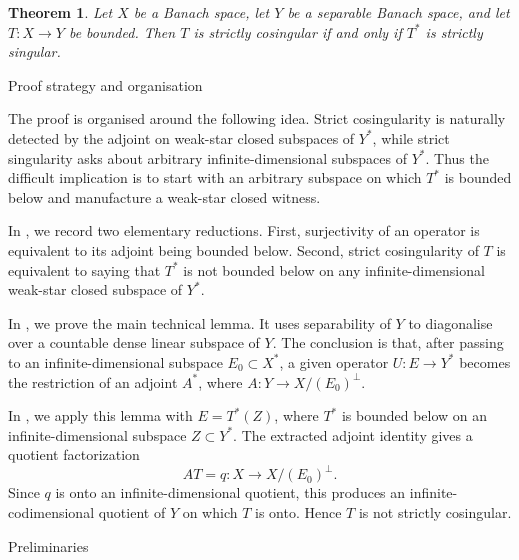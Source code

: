 \documentclass[11pt,reqno]{amsart}
\makeatletter
\theoremstyle{plain}
\newtheorem{theorem}{Theorem}[section]
\theoremstyle{definition}
\newcounter{problempaper}
\newenvironment{problempaperbody}{%
  \setcounter{subsection}{0}%
  \setcounter{subsubsection}{0}%
  \setcounter{paragraph}{0}%
  \renewcommand{\thesubsection}{\arabic{subsection}}%
  \renewcommand{\thesubsubsection}{\thesubsection.\arabic{subsubsection}}%
  \renewcommand{\theparagraph}{\thesubsubsection.\arabic{paragraph}}%
  \let\problem@outersection\section
  \let\problem@outersubsection\subsection
  \let\problem@outersubsubsection\subsubsection
  \let\problem@outerparagraph\paragraph
  \let\section\problem@papersection
  \let\subsection\problem@papersubsection
  \let\subsubsection\problem@papersubsubsection
}{%
  \let\section\problem@outersection
  \let\subsection\problem@outersubsection
  \let\subsubsection\problem@outersubsubsection
  \let\paragraph\problem@outerparagraph
}
\newcommand{\problem@target}[2]{%
  \hypertarget{problem-\theproblempaper-#1-#2}{}%
}
\newcommand{\problem@paperheading}[3]{%
  \par\bigskip
  \problem@target{#1}{#2}%
  \noindent{\large\bfseries #2.\quad #3\par}%
  \nobreak\smallskip
}
\newcommand{\problem@papersubheading}[3]{%
  \par\medskip
  \problem@target{#1}{#2}%
  \noindent{\normalsize\bfseries #2.\quad #3\par}%
  \nobreak\smallskip
}
\newcommand{\problem@papersubsubheading}[3]{%
  \par\smallskip
  \problem@target{#1}{#2}%
  \noindent{\normalsize\itshape #2.\quad #3.\ }%
}
\def\problem@papersection{%
  \@ifstar{\problem@papersectionstar}{\problem@papersectionnostar}%
}
\def\problem@papersectionstar#1{%
  \par\bigskip\noindent{\large\bfseries #1\par}\nobreak\smallskip
}
\def\problem@papersectionnostar#1{%
  \refstepcounter{subsection}%
  \setcounter{subsubsection}{0}%
  \setcounter{paragraph}{0}%
  \problem@paperheading{section}{\thesubsection}{#1}%
  \problem@writecontentsline{section}{\thesubsection}{#1}%
}
\def\problem@papersubsection{%
  \@ifstar{\problem@papersubsectionstar}{\problem@papersubsectionnostar}%
}
\def\problem@papersubsectionstar#1{%
  \par\medskip\noindent{\normalsize\bfseries #1\par}\nobreak\smallskip
}
\def\problem@papersubsectionnostar#1{%
  \refstepcounter{subsubsection}%
  \setcounter{paragraph}{0}%
  \problem@papersubheading{subsection}{\thesubsubsection}{#1}%
  \problem@writecontentsline{subsection}{\thesubsubsection}{#1}%
}
\def\problem@papersubsubsection{%
  \@ifstar{\problem@papersubsubsectionstar}{\problem@papersubsubsectionnostar}%
}
\def\problem@papersubsubsectionstar#1{%
  \par\smallskip\noindent{\normalsize\itshape #1.\ }%
}
\def\problem@papersubsubsectionnostar#1{%
  \refstepcounter{paragraph}%
  \problem@papersubsubheading{subsubsection}{\theparagraph}{#1}%
  \problem@writecontentsline{subsubsection}{\theparagraph}{#1}%
}
\newcommand{\problem@writecontentsline}[3]{%
  \begingroup
  \protected@write\@auxout{}{%
    \string\problemcontentsentry{\theproblempaper}{#1}{#2}{#3}{\thepage}%
  }%
  \endgroup
}
\newcommand{\problemcontentsentry}[5]{%
  \@ifundefined{problemcontents@#1}{%
    \expandafter\gdef\csname problemcontents@#1\endcsname{}%
  }{}%
  \expandafter\g@addto@macro\csname problemcontents@#1\endcsname{%
    \problemcontentsline{#1}{#2}{#3}{#4}{#5}%
  }%
}
\newcommand{\problemcontentslink}[4]{%
  \hyperlink{problem-#1-#2-#3}{#4}%
}
\newcommand{\problemcontentsline}[5]{%
  \ifstrequal{#2}{section}{%
    \par\noindent
    \problemcontentslink{#1}{#2}{#3}{\makebox[2.5em][l]{#3}#4}%
    \nobreak\dotfill
    \problemcontentslink{#1}{#2}{#3}{#5}\par
  }{%
    \ifstrequal{#2}{subsection}{%
      \par\noindent\hspace*{1.5em}%
      \problemcontentslink{#1}{#2}{#3}{\makebox[3.5em][l]{#3}#4}%
      \nobreak\dotfill
      \problemcontentslink{#1}{#2}{#3}{#5}\par
    }{%
      \par\noindent\hspace*{3em}%
      \problemcontentslink{#1}{#2}{#3}{\makebox[4.5em][l]{#3}#4}%
      \nobreak\dotfill
      \problemcontentslink{#1}{#2}{#3}{#5}\par
    }%
  }%
}
\makeatother
\begin{document}
\begin{problempaperbody}
\begin{theorem}
\label{p4:thm:main}
    Let $X$ be a Banach space, let $Y$ be a separable Banach space, and let $T \colon X\to Y$ be bounded. Then $T$ is strictly cosingular if and only if $T^*$ is strictly singular.
\end{theorem}

\section{Proof strategy and organisation}
\label{p4:sec:strategy}

The proof is organised around the following idea. Strict cosingularity is naturally detected by the adjoint on weak-star closed subspaces of $Y^*$, while strict singularity asks about arbitrary infinite-dimensional subspaces of $Y^*$. Thus the difficult implication is to start with an arbitrary subspace on which $T^*$ is bounded below and manufacture a weak-star closed witness.

In , we record two elementary reductions. First, surjectivity of an operator is equivalent to its adjoint being bounded below. Second, strict cosingularity of $T$ is equivalent to saying that $T^*$ is not bounded below on any infinite-dimensional weak-star closed subspace of $Y^*$.

In , we prove the main technical lemma. It uses separability of $Y$ to diagonalise over a countable dense linear subspace of $Y$. The conclusion is that, after passing to an infinite-dimensional subspace $E_0\subset X^*$, a given operator $U \colon E\to Y^*$ becomes the restriction of an adjoint $A^*$, where $A \colon Y\to X/(E_0)^\perp$.

In , we apply this lemma with $E=T^*(Z)$, where $T^*$ is bounded below on an infinite-dimensional subspace $Z\subset Y^*$. The extracted adjoint identity gives a quotient factorization
\begin{equation*}
        AT=q:X\to X/(E_0)^\perp.
\end{equation*}
Since $q$ is onto an infinite-dimensional quotient, this produces an infinite-codimensional quotient of $Y$ on which $T$ is onto. Hence $T$ is not strictly cosingular.

\section{Preliminaries}
\label{p4:sec:preliminaries}


\end{problempaperbody}
\end{document}
